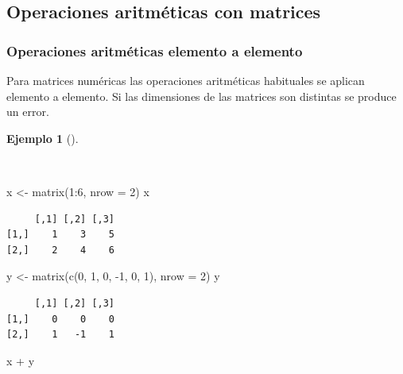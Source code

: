 \documentclass[
  a4paper,
]{scrreport}
\newenvironment{Shaded}{\begin{snugshade}}{\end{snugshade}}
\newcommand{\AttributeTok}[1]{\textcolor[rgb]{0.40,0.45,0.13}{#1}}
\newcommand{\DecValTok}[1]{\textcolor[rgb]{0.68,0.00,0.00}{#1}}
\newcommand{\FunctionTok}[1]{\textcolor[rgb]{0.28,0.35,0.67}{#1}}
\newcommand{\NormalTok}[1]{\textcolor[rgb]{0.00,0.23,0.31}{#1}}
\newcommand{\OtherTok}[1]{\textcolor[rgb]{0.00,0.23,0.31}{#1}}
\newcommand{\SpecialCharTok}[1]{\textcolor[rgb]{0.37,0.37,0.37}{#1}}
\theoremstyle{definition}
\theoremstyle{definition}
\newtheorem{example}{Ejemplo}[chapter]
\theoremstyle{remark}
\begin{document}
\subsection{Operaciones aritméticas con
matrices}\label{operaciones-aritmuxe9ticas-con-matrices}

\subsubsection{Operaciones aritméticas elemento a
elemento}\label{operaciones-aritmuxe9ticas-elemento-a-elemento-1}

Para matrices numéricas las operaciones aritméticas habituales se
aplican elemento a elemento. Si las dimensiones de las matrices son
distintas se produce un error.

\begin{example}[]\protect\hypertarget{exm-operaciones-aritmeticas-matrices}{}\label{exm-operaciones-aritmeticas-matrices}

~

\begin{Shaded}
\begin{Highlighting}[]
\NormalTok{x }\OtherTok{\textless{}{-}} \FunctionTok{matrix}\NormalTok{(}\DecValTok{1}\SpecialCharTok{:}\DecValTok{6}\NormalTok{, }\AttributeTok{nrow =} \DecValTok{2}\NormalTok{)}
\NormalTok{x}
\end{Highlighting}
\end{Shaded}

\begin{verbatim}
     [,1] [,2] [,3]
[1,]    1    3    5
[2,]    2    4    6
\end{verbatim}

\begin{Shaded}
\begin{Highlighting}[]
\NormalTok{y }\OtherTok{\textless{}{-}} \FunctionTok{matrix}\NormalTok{(}\FunctionTok{c}\NormalTok{(}\DecValTok{0}\NormalTok{, }\DecValTok{1}\NormalTok{, }\DecValTok{0}\NormalTok{, }\SpecialCharTok{{-}}\DecValTok{1}\NormalTok{, }\DecValTok{0}\NormalTok{, }\DecValTok{1}\NormalTok{), }\AttributeTok{nrow =} \DecValTok{2}\NormalTok{)}
\NormalTok{y}
\end{Highlighting}
\end{Shaded}

\begin{verbatim}
     [,1] [,2] [,3]
[1,]    0    0    0
[2,]    1   -1    1
\end{verbatim}

\begin{Shaded}
\begin{Highlighting}[]
\NormalTok{x }\SpecialCharTok{+}\NormalTok{ y}
\end{Highlighting}
\end{Shaded}


\end{example}
\end{document}
